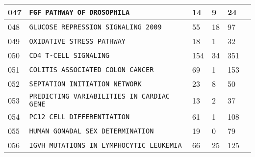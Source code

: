 \documentclass{article}
\begin{document}
\begin{center}
\begin{tabular}{ | C{16pt} | C{149pt} | C{25pt} | C{25pt} | C{25pt} | C{35pt} | }
		 & \texttt{FGF PATHWAY OF DROSOPHILA} & 14 & 9 & 24 & \cite{bbm-047, cell-collective} \\ 
		 & \texttt{GLUCOSE REPRESSION SIGNALING~2009} & 55 & 18 & 97 & \cite{bbm-048, cell-collective} \\
		 & \texttt{OXIDATIVE STRESS PATHWAY} & 18 & 1 & 32 & \cite{bbm-049, cell-collective} \\
		 & \texttt{CD4 T-CELL SIGNALING} & 154 & 34 & 351 & \cite{bbm-050, cell-collective} \\
		 & \texttt{COLITIS ASSOCIATED COLON~CANCER} & 69 & 1 & 153 & \cite{bbm-051, cell-collective} \\
		 & \texttt{SEPTATION INITIATION NETWORK} & 23 & 8 & 50 & \cite{bbm-052, cell-collective} \\
		 & \texttt{PREDICTING VARIABILITIES IN~CARDIAC GENE} & 13 & 2 & 37 & \cite{bbm-053, cell-collective} \\ 
		 & \texttt{PC12 CELL DIFFERENTIATION} & 61 & 1 & 108 & \cite{bbm-054, cell-collective} \\
		 & \texttt{HUMAN GONADAL SEX DETERMINATION} & 19 & 0 & 79 & \cite{bbm-055, cell-collective} \\
		 & \texttt{IGVH MUTATIONS IN~LYMPHOCYTIC LEUKEMIA} & 66 & 25 & 125 & \cite{bbm-056, cell-collective} \\
		\hline
	\end{tabular}


\end{center}
\end{document}
